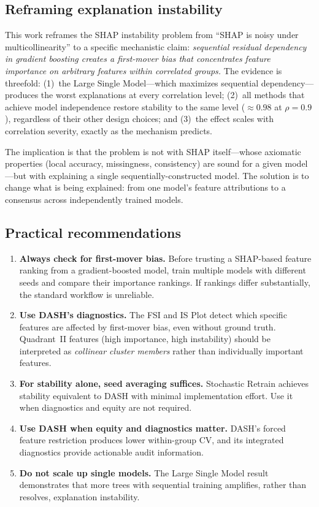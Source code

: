 \documentclass[11pt]{article}
\newcommand{\dash}{\textsc{DASH}}
\newcommand{\rhovar}{\rho}
\begin{document}
\subsection{Reframing explanation instability}

This work reframes the SHAP instability problem from ``SHAP is noisy
under multicollinearity'' to a specific mechanistic claim:
\emph{sequential residual dependency in gradient boosting creates a
first-mover bias that concentrates feature importance on arbitrary
features within correlated groups.} The evidence is threefold:
(1)~the Large Single Model---which maximizes sequential dependency---produces
the worst explanations at every correlation level;
(2)~all methods that achieve model independence restore stability to the
same level ($\approx 0.98$ at $\rhovar = 0.9$), regardless of their other
design choices; and
(3)~the effect scales with correlation severity, exactly as the mechanism
predicts.

The implication is that the problem is not with SHAP itself---whose
axiomatic properties (local accuracy, missingness, consistency) are
sound for a given model---but with explaining a single
sequentially-constructed model. The solution is to change what is
being explained: from one model's feature attributions to a consensus
across independently trained models.

\subsection{Practical recommendations}

\begin{enumerate}
  \item \textbf{Always check for first-mover bias.} Before trusting a
    SHAP-based feature ranking from a gradient-boosted model, train
    multiple models with different seeds and compare their importance
    rankings. If rankings differ substantially, the standard workflow
    is unreliable.
  \item \textbf{Use \dash{}'s diagnostics.} The FSI and IS Plot detect
    which specific features are affected by first-mover bias, even
    without ground truth. Quadrant~II features (high importance, high
    instability) should be interpreted as \emph{collinear cluster
    members} rather than individually important features.
  \item \textbf{For stability alone, seed averaging suffices.}
    Stochastic Retrain achieves stability equivalent to \dash{} with
    minimal implementation effort. Use it when diagnostics and equity
    are not required.
  \item \textbf{Use \dash{} when equity and diagnostics matter.}
    \dash{}'s forced feature restriction produces lower within-group
    CV, and its integrated diagnostics provide actionable audit
    information.
  \item \textbf{Do not scale up single models.} The Large Single Model
    result demonstrates that more trees with sequential training
    amplifies, rather than resolves, explanation instability.
\end{enumerate}
\end{document}
